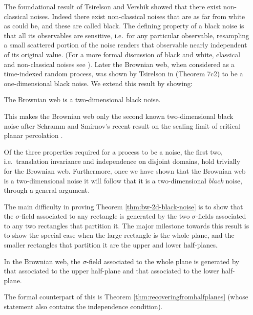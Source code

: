 {The foundational result of Tsirelson and Vershik \cite{tsirelson-vershik} showed that there
exist non-classical noises.  Indeed there exist non-classical noises
that are as far from white as could be, and these are called black.  The
defining property of a black noise is that all its observables are
sensitive, i.e.\ for any particular observable, resampling
a small scattered portion of the noise
renders that observable nearly independent of its original
value.  (For a more formal discussion of black and white, classical
and non-classical noises see \cite{tsirelson-nonclassical-stochastic-flows}).
Later the Brownian web,
when considered as a time-indexed random process,
was shown by Tsirelson in
\cite{tsirelson-scaling-limit-noise-stability} (Theorem 7c2)
to be a one-dimensional black noise.  We
extend this
result by showing:

\begin{theorem}
\label{thm:bw-2d-black-noise}
The Brownian web is a
two-dimensional black noise.
\end{theorem}

This makes the Brownian web only the second
known two-dimensional black noise after Schramm and Smirnov's
recent result on the scaling limit of critical planar
percolation \cite{schramm-smirnov}.

Of the three properties required for a process to be a noise, the
first two, i.e.\ translation invariance and independence on disjoint
domains, hold trivially for the Brownian web.  Furthermore, once we
have shown that the Brownian web is a two-dimensional noise it will
follow that it is a two-dimensional \emph{black} noise,
through a general argument.

The main difficulty in proving
Theorem \ref{thm:bw-2d-black-noise} is to show that the $\sigma$-field
associated to any rectangle is generated by the two $\sigma$-fields
associated to any two rectangles that partition it.
The major milestone towards this result is to show the special case
when the large rectangle is the whole plane, and the smaller
rectangles that partition it are the upper and lower half-planes.

\begin{theorem}
\label{thm:informal-recovering-from-half-planes}
In the Brownian web, the $\sigma$-field associated to the whole plane
is generated by that associated to the upper half-plane and that
associated to the lower half-plane.
\end{theorem}

The formal counterpart of this is
Theorem \ref{thm:recoveringfromhalfplanes} (whose statement also
contains the independence condition).

}
